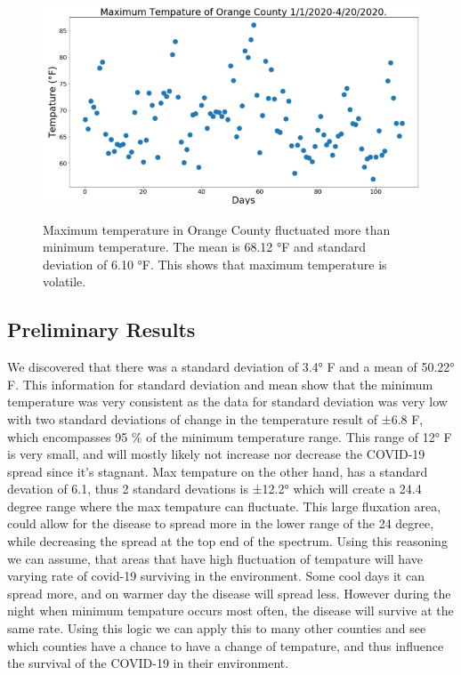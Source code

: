 \documentclass[10pt,journal,compsoc]{IEEEtran}
\begin{document}
{{\begin{figure}[!htbp] %
	\includegraphics[scale=0.45]{max-orange.png}\\ 
	\centering
	\caption{Maximum temperature in Orange County fluctuated more than minimum temperature. The mean is 68.12 °F  and standard deviation of 6.10 °F. This shows that maximum temperature is volatile.
 }
	\label{LP-COVID-Maximum Temperature}
\end{figure}


\subsection{Preliminary Results}
\label{subsec:preliminary results}

	We discovered that there was a standard deviation of 3.4° F and a mean of 50.22° F. This information for standard deviation and mean show that the minimum temperature was very consistent as the data for standard deviation was very low with two standard deviations of change in the temperature result of ±6.8 F, which encompasses 95 \% of the minimum temperature range. This range of 12° F is very small, and will mostly likely not increase nor decrease the COVID-19 spread since it's stagnant. Max tempature on the other hand, has a standard devation of 6.1, thus 2 standard devations is ±12.2° which will create a 24.4 degree range where the max tempature can fluctuate. This large fluxation area, could allow for the disease to spread more in the lower range of the 24 degree, while decreasing the spread at the top end of the spectrum. Using this reasoning we can assume, that areas that have high fluctuation of tempature will have varying rate of covid-19 surviving in the environment. Some cool days it can spread more, and on warmer day the disease will spread less. However during the night when minimum tempature occurs most often, the disease will survive at the same rate. Using this logic we can apply this to many other counties and see which counties have a chance to have a change of tempature, and thus influence the survival of the COVID-19 in their environment. 

}}
\end{document}

